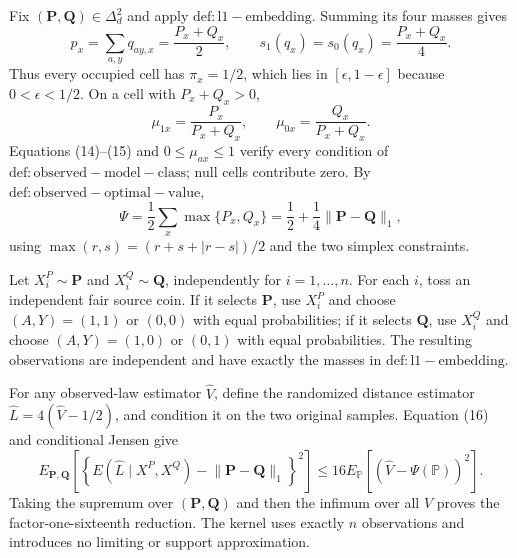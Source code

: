 Fix \((\mathbf P,\mathbf Q)\in\Delta_d^2\) and apply \(\mathrm{def:l1-embedding}\).  Summing its four masses gives
\[
 p_x=\sum_{a,y}q_{ay,x}=\frac{P_x+Q_x}{2},\qquad
 s_1(q_x)=s_0(q_x)=\frac{P_x+Q_x}{4}.                               \tag{14}
\]
Thus every occupied cell has \(\pi_x=1/2\), which lies in \([\epsilon,1-\epsilon]\) because \(0<\epsilon<1/2\).  On a cell with \(P_x+Q_x>0\),
\[
 \mu_{1x}=\frac{P_x}{P_x+Q_x},\qquad
 \mu_{0x}=\frac{Q_x}{P_x+Q_x}.                                     \tag{15}
\]
Equations (14)--(15) and \(0\leq\mu_{ax}\leq1\) verify every condition of \(\mathrm{def:observed-model-class}\); null cells contribute zero.  By \(\mathrm{def:observed-optimal-value}\),
\[
 \Psi=\frac12\sum_x\max\{P_x,Q_x\}
 =\frac12+\frac14\lVert\mathbf P-\mathbf Q\rVert_1,              \tag{16}
\]
using \(\max(r,s)=(r+s+|r-s|)/2\) and the two simplex constraints.

Let \(X_i^P\sim\mathbf P\) and \(X_i^Q\sim\mathbf Q\), independently for \(i=1,\ldots,n\).  For each \(i\), toss an independent fair source coin.  If it selects \(\mathbf P\), use \(X_i^P\) and choose \((A,Y)=(1,1)\) or \((0,0)\) with equal probabilities; if it selects \(\mathbf Q\), use \(X_i^Q\) and choose \((A,Y)=(1,0)\) or \((0,1)\) with equal probabilities.  The resulting observations are independent and have exactly the masses in \(\mathrm{def:l1-embedding}\).

For any observed-law estimator \(\widehat V\), define the randomized distance estimator \(\widehat L=4(\widehat V-1/2)\), and condition it on the two original samples.  Equation (16) and conditional Jensen give
\[
 E_{\mathbf P,\mathbf Q}\left[
 \left\{E(\widehat L\mid X^P,X^Q)-\lVert\mathbf P-\mathbf Q\rVert_1\right\}^2\right]
 \leq16E_{\mathbb P}\left[(\widehat V-\Psi(\mathbb P))^2\right]. \tag{17}
\]
Taking the supremum over \((\mathbf P,\mathbf Q)\) and then the infimum over all \(\widehat V\) proves the factor-one-sixteenth reduction.  The kernel uses exactly \(n\) observations and introduces no limiting or support approximation.